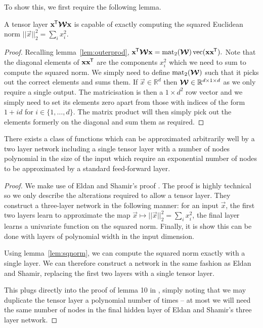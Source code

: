 To show this, we first require the following lemma.
\begin{lem}\label{lem:sqnorm}
	A tensor layer \(\mathbf{x}^{\mkern-1.5mu\mathsf{T}}\bm{\mathcal{W}}\mathbf{x}\) is capable of exactly computing the squared
	Euclidean norm \(||\vec{x}||^2_2 = \sum_i x_i^2\).
\end{lem}
\begin{proof}
Recalling lemma~\ref{lem:outerprod},
\( \label{eq:outerquad}
	\mathbf{x}^{\mkern-1.5mu\mathsf{T}}\bm{\mathcal{W}}\mathbf{x} = \operatorname{mat}_2(\bm{\mathcal{W}}) \operatorname{vec}(\mathbf{x}\mathbf{x}^{\mkern-1.5mu\mathsf{T}}).
\) Note that the diagonal elements of \(\mathbf{x}\mathbf{x}^{\mkern-1.5mu\mathsf{T}}\) are the components
\(x_i^2\) which we need to sum to compute the squared norm. We simply need to define
\(\operatorname{mat}_2(\bm{\mathcal{W}})\) such that it picks out the correct elements and sums them. If 
\(\vec{x} \in \mathbb{R}^d\) then \(\bm{\mathcal{W}} \in \mathbb{R}^{d \times 1 \times d}\) as we only
require a single output. The matricisation is then a \(1 \times d^2\) row vector and we simply need
to set its elements zero apart from those with indices of the form \(1 + id\) for 
\(i \in \{1, \ldots, d\}\). The matrix product will then simply pick out the elements formerly
on the diagonal and sum them as required.
\end{proof}

\begin{thm}
There exists a class of functions which can be approximated arbitrarily well by a two layer network
including a single tensor layer with a number of nodes polynomial in the size of the input which
require an exponential number of nodes to be approximated by a standard feed-forward layer.
\end{thm}
\begin{proof}
We make use of Eldan and Shamir's proof \autocite{Eldan2016}. The proof is highly technical so we 
only describe the alterations required to allow a tensor layer.
They construct a three-layer network in the following manner:
for an input \(\vec{x}\), the first two layers learn to approximate the map 
\(\vec{x}\mapsto ||\vec{x}||^2_2 = \sum_i x_i^2\), the final layer learns a univariate function on the
squared norm. Finally, it is show this can be done with layers of polynomial width in the input
dimension.

Using lemma~\ref{lem:sqnorm}, we can compute the squared norm exactly
with a single layer. We can therefore construct a network in
the same fashion as Eldan and Shamir, replacing the first two layers with a single tensor layer. 

This plugs directly into the proof of lemma 10 in \autocite[18--19]{Eldan2016}, simply noting that
we may duplicate the tensor layer a polynomial number of times -- at most we will need the same number of
nodes in the final hidden layer of Eldan and Shamir's three layer network.
\end{proof}


